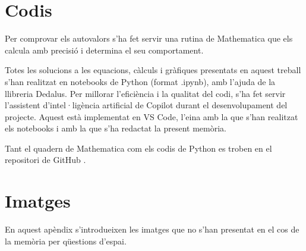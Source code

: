 \newpage
\renewcommand{\theequation}{\Alph{section}\arabic{equation}}
\setcounter{equation}{0}
\appendix

\chapter{Codis}\label{ap.A}
Per comprovar els autovalors s'ha fet servir una rutina de Mathematica que els calcula amb precisió i determina el seu comportament.

Totes les solucions a les equacions, càlculs i gràfiques presentats en aquest treball s'han realitzat en notebooks
de Python (format .ipynb), amb l'ajuda de la llibreria Dedalus.
Per millorar l'eficiència i la qualitat del codi, 
s'ha fet servir l'assistent d'intel·ligència artificial de Copilot durant el desenvolupament del projecte.
Aquest està implementat en VS Code, l'eina amb la que s'han realitzat els notebooks i amb la que s'ha redactat la present memòria.

Tant el quadern de Mathematica com els codis de Python es troben en el repositori de GitHub \parencite{github}.

\chapter{Imatges} \label{ap.B}
En aquest apèndix s'introdueixen les imatges que no s'han presentat en el cos de la memòria per qüestions d'espai.

